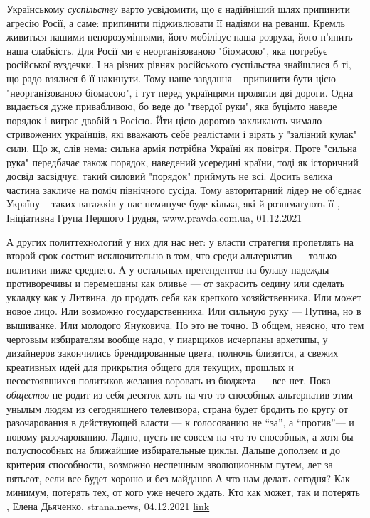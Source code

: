 Українському \emph{суспільству} варто усвідомити, що є надійніший шлях припинити
агресію Росії, а саме: припинити підживлювати її надіями на реванш.  Кремль
живиться нашими непорозуміннями, його мобілізує наша розруха, його п’янить наша
слабкість. Для Росії ми є неорганізованою "біомасою", яка потребує російської
вуздечки. І на різних рівнях російського суспільства знайшлися б ті, що радо
взялися б її накинути.  Тому наше завдання – припинити бути цією
"неорганізованою біомасою", і тут перед українцями пролягли дві дороги.  Одна
видається дуже привабливою, бо веде до "твердої руки", яка буцімто наведе
порядок і виграє двобій з Росією. Йти цією дорогою закликають чимало
стривожених українців, які вважають себе реалістами і вірять у "залізний кулак"
сили. Що ж, слів нема: сильна армія потрібна Україні як повітря. Проте "сильна
рука" передбачає також порядок, наведений усередині країни, тоді як історичний
досвід засвідчує: такий силовий "порядок" приймуть не всі. Досить велика
частина закличе на поміч північного сусіда. Тому авторитарний лідер не об’єднає
Україну – таких ватажків у нас неминуче буде кілька, які й розшматують її
, 
Ініціативна Група Першого Грудня, www.pravda.com.ua, 01.12.2021

А других политтехнологий у них для нас нет: у власти стратегия пропетлять на
второй срок состоит исключительно в том, что среди альтернатив — только
политики ниже среднего. А у остальных претендентов на булаву надежды
противоречивы и перемешаны как оливье — от закрасить седину или сделать укладку
как у Литвина, до продать себя как крепкого хозяйственника. Или может новое
лицо. Или возможно государственника. Или сильную руку — Путина, но в вышиванке.
Или молодого Януковича. Но это не точно. В общем, неясно, что тем чертовым
избирателям вообще надо, у пиарщиков исчерпаны архетипы, у дизайнеров
закончились брендированные цвета, полночь близится, а свежих креативных идей
для прикрытия общего для текущих, прошлых и несостоявшихся политиков желания
воровать из бюджета — все нет.  Пока \emph{общество} не родит из себя десяток
хоть на что-то способных альтернатив этим унылым людям из сегодняшнего
телевизора, страна будет бродить по кругу от разочарования в действующей власти
— к голосованию не \enquote{за}, а \enquote{против}— и новому разочарованию. Ладно, пусть не
совсем на что-то способных, а хотя бы полуспособных на ближайшие избирательные
циклы. Дальше доползем и до критерия способности, возможно неспешным
эволюционным путем, лет за пятьсот, если все будет хорошо и без майданов А что
нам делать сегодня? Как минимум, потерять тех, от кого уже нечего ждать.  Кто
как может, так и потерять
, 
Елена Дьяченко, strana.news, 04.12.2021
\href{https://strana.news/opinions/365443-alternativy-vlasti-takaja-zhe-kromeshnaja-bezyskhodnost-kak-i-ona-sama.html}{link}


